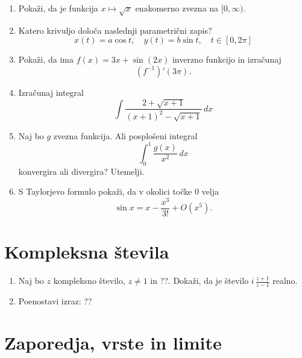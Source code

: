 \documentclass[a4paper,12pt]{article}
\begin{document}
\begin{enumerate}
    \item Pokaži, da je funkcija $x \mapsto \sqrt{x}$ enakomerno zvezna na $[0, \infty)$.

    \item Katero krivuljo določa naslednji parametrični zapis?
    \[
    x(t) = a \cos t, \quad y(t) = b \sin t, \quad t \in [0, 2\pi]
    \]

    \item Pokaži, da ima $f(x) = 3x + \sin(2x)$ inverzno funkcijo in izračunaj
    \[
    (f^{-1})'(3\pi).
    \]

    \item Izračunaj integral
    \[
    \int \frac{2 + \sqrt{x+1}}{(x+1)^2 - \sqrt{x+1}} \, dx
    \]
    \item Naj bo $g$ zvezna funkcija. Ali posplošeni integral
    \[
    \int_0^1 \frac{g(x)}{x^2} \, dx
    \]
    konvergira ali divergira? Utemelji.

    \item S Taylorjevo formulo pokaži, da v okolici točke $0$ velja
    \[
    \sin x = x - \frac{x^3}{3!} + O(x^5).
    \]
\end{enumerate}




\section*{Kompleksna števila}

\begin{enumerate}
\item
Naj bo \(z\) kompleksno število, \(z \ne 1\) in ??.
Dokaži, da je število \( i \, \frac{z+1}{z-1} \) realno.

\item
Poenostavi izraz:
??
\end{enumerate}

\section*{Zaporedja, vrste in limite}
\end{document}
